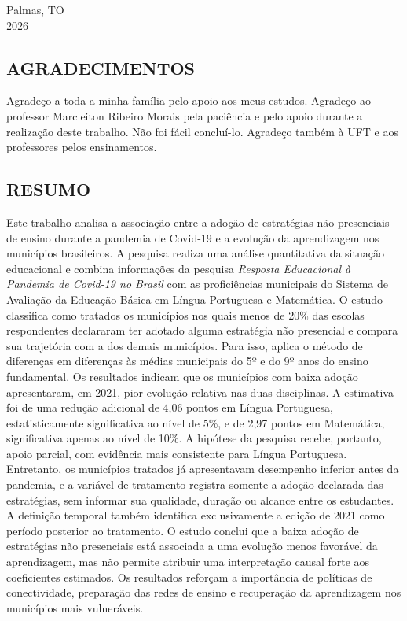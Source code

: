 \documentclass[
	12pt,				%
	openright,			%
	oneside,			%
	a4paper,			%
	brazil,				%
	]{article}
\renewcommand{\baselinestretch}{1.3}
\begin{document}
\vspace*{\fill}
\begin{center}
Palmas, TO \\ 2026
\end{center}

\newpage
\thispagestyle{empty}
\begin{center}
\section*{AGRADECIMENTOS}
\end{center}

\noindent Agradeço a toda a minha família pelo apoio aos meus estudos. Agradeço ao
professor Marcleiton Ribeiro Morais pela paciência e pelo apoio durante a realização
deste trabalho. Não foi fácil concluí-lo. Agradeço também à UFT e aos professores
pelos ensinamentos.

\newpage
\thispagestyle{empty}
\begin{center}
\section*{RESUMO}
\end{center}

\begingroup
\renewcommand{\baselinestretch}{1.0}\selectfont
\noindent Este trabalho analisa a associação entre a adoção de estratégias não
presenciais de ensino durante a pandemia de Covid-19 e a evolução da aprendizagem
nos municípios brasileiros. A pesquisa realiza uma análise quantitativa da
situação educacional e combina informações da pesquisa \textit{Resposta
Educacional à Pandemia de Covid-19 no Brasil} com as proficiências municipais do
Sistema de Avaliação da Educação Básica em Língua Portuguesa e Matemática. O
estudo classifica como tratados os municípios nos quais menos de 20\% das escolas
respondentes declararam ter adotado alguma estratégia não presencial e compara
sua trajetória com a dos demais municípios. Para isso, aplica o método de
diferenças em diferenças às médias municipais do 5º e do 9º anos do ensino
fundamental. Os resultados indicam que os municípios com baixa adoção apresentaram,
em 2021, pior evolução relativa nas duas disciplinas. A estimativa foi de uma
redução adicional de 4,06 pontos em Língua Portuguesa, estatisticamente
significativa ao nível de 5\%, e de 2,97 pontos em Matemática, significativa
apenas ao nível de 10\%. A hipótese da pesquisa recebe, portanto, apoio parcial,
com evidência mais consistente para Língua Portuguesa. Entretanto, os municípios
tratados já apresentavam desempenho inferior antes da pandemia, e a variável de
tratamento registra somente a adoção declarada das estratégias, sem informar sua
qualidade, duração ou alcance entre os estudantes. A definição temporal também
identifica exclusivamente a edição de 2021 como período posterior ao tratamento.
O estudo conclui que a baixa adoção de estratégias não presenciais está associada
a uma evolução menos favorável da aprendizagem, mas não permite atribuir uma
interpretação causal forte aos coeficientes estimados. Os resultados reforçam a
importância de políticas de conectividade, preparação das redes de ensino e
recuperação da aprendizagem nos municípios mais vulneráveis.
\end{document}
